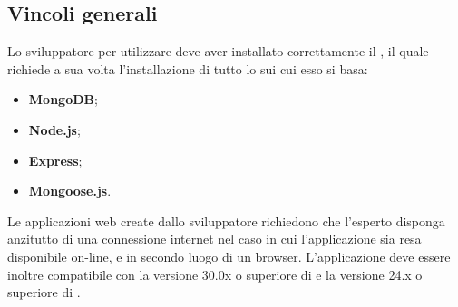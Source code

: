 	\subsection{Vincoli generali}
	Lo sviluppatore per utilizzare \ProjectName{} deve aver installato correttamente il , il quale richiede a sua volta l'installazione di tutto lo  sui cui esso si basa:
	\begin{itemize}
		\item \textbf{MongoDB};
		\item \textbf{Node.js};
		\item \textbf{Express};
		\item \textbf{Mongoose.js}.
	\end{itemize}
	Le applicazioni web create dallo sviluppatore richiedono che l'esperto  disponga anzitutto di una connessione internet nel caso in cui l'applicazione sia resa disponibile on-line, e in secondo luogo di un browser. L'applicazione deve essere inoltre compatibile con la versione 30.0x o superiore di  e la versione 24.x o superiore di .